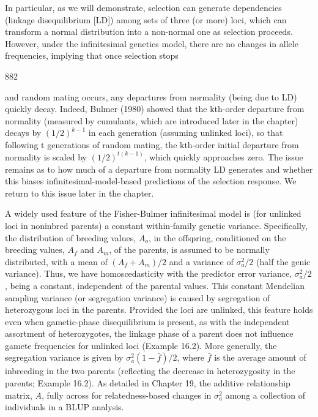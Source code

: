 \documentclass{article}
\begin{document}
In particular, as we will demonstrate, selection can generate dependencies (linkage disequilibrium [LD]) among sets of three (or more) loci, which can transform a normal distribution into a non-normal one as selection proceeds. However, under the infinitesimal genetics model, there are no changes in allele frequencies, implying that once selection stops

882

and random mating occurs, any departures from normality (being due to LD) quickly decay. Indeed, Bulmer (1980) showed that the kth-order departure from normality (measured by cumulants, which are introduced later in the chapter) decays by  $ (1/2)^{k-1} $ in each generation (assuming unlinked loci), so that following t generations of random mating, the kth-order initial departure from normality is scaled by  $ (1/2)^{t(k-1)} $, which quickly approaches zero. The issue remains as to how much of a departure from normality LD generates and whether this biases infinitesimal-model-based predictions of the selection response. We return to this issue later in the chapter.

A widely used feature of the Fisher-Bulmer infinitesimal model is (for unlinked loci in noninbred parents) a constant within-family genetic variance. Specifically, the distribution of breeding values,  $ A_o $, in the offspring, conditioned on the breeding values,  $ A_f $ and  $ A_m $, of the parents, is assumed to be normally distributed, with a mean of  $ (A_f + A_m)/2 $ and a variance of  $ \sigma_a^2/2 $ (half the genic variance). Thus, we have homoscedasticity with the predictor error variance,  $ \sigma_a^2/2 $, being a constant, independent of the parental values. This constant Mendelian sampling variance (or segregation variance) is caused by segregation of heterozygous loci in the parents. Provided the loci are unlinked, this feature holds even when gametic-phase disequilibrium is present, as with the independent assortment of heterozygotes, the linkage phase of a parent does not influence gamete frequencies for unlinked loci (Example 16.2). More generally, the segregation variance is given by  $ \sigma_a^2(1 - \bar{f})/2 $, where  $ \bar{f} $ is the average amount of inbreeding in the two parents (reflecting the decrease in heterozygosity in the parents; Example 16.2). As detailed in Chapter 19, the additive relationship matrix,  $ A $, fully across for relatedness-based changes in  $ \sigma_a^2 $ among a collection of individuals in a BLUP analysis.
\end{document}
